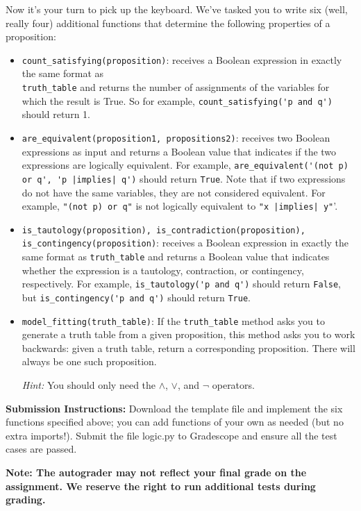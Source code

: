 \documentclass{article}
\begin{document}
    Now it's your turn to pick up the keyboard. We've tasked you to write six (well, really four) additional functions that determine the following properties of a proposition:
    \begin{itemize}
        \item \lstinline+count_satisfying(proposition)+: receives a Boolean expression in exactly the same format as \\ \lstinline+truth_table+ and returns the number of assignments of the variables for which the result is True. So for example, \lstinline+count_satisfying('p and q')+ should return 1.
        \item \lstinline+are_equivalent(proposition1, propositions2)+: receives two Boolean expressions as input and returns a Boolean value that indicates if the two expressions are logically equivalent. For example, \lstinline+are_equivalent('(not p) or q', 'p |implies| q')+ should return \lstinline+True+. Note that if two expressions do not have the same variables, they are not considered equivalent. For example, \lstinline+"(not p) or q"+ is not logically equivalent to \lstinline+"x |implies| y"+'.
        \item \lstinline+is_tautology(proposition), is_contradiction(proposition), is_contingency(proposition)+: receives a Boolean expression in exactly the same format as \lstinline+truth_table+ and returns a Boolean value that indicates whether the expression is a tautology, contraction, or contingency, respectively. For example, \lstinline+is_tautology('p and q')+ should return \lstinline+False+, but \lstinline+is_contingency('p and q')+ should return \lstinline+True+.
        \item \lstinline+model_fitting(truth_table)+: If the \lstinline+truth_table+ method asks you to generate a truth table from a given proposition, this method asks you to work backwards: given a truth table, return a corresponding proposition. There will always be one such proposition.
        
        \textit{Hint:} You should only need the $\land$, $\lor$, and $\neg$ operators.
    \end{itemize}

    \vspace{3mm}
    \textbf{Submission Instructions:} 
    Download the template file and implement the six functions specified above; you can add functions of your own as needed (but no extra imports!). Submit the file logic.py to Gradescope and ensure all the test cases are passed. 

    \vspace{3mm}
    \textbf{Note: The autograder may not reflect your final grade on the assignment. We reserve the right to run additional tests during grading.}
    
\end{document}
